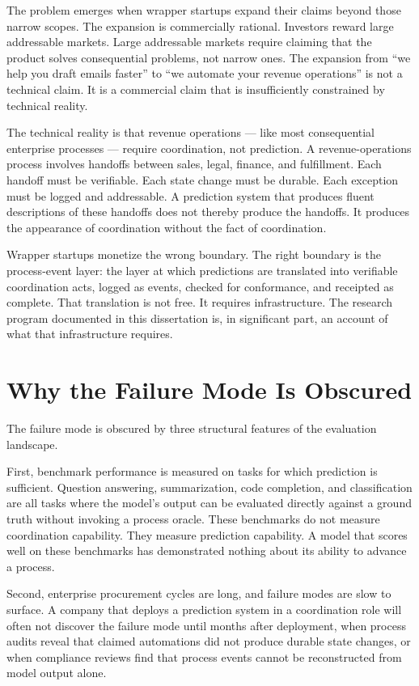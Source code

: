 The problem emerges when wrapper startups expand their claims beyond those narrow scopes. The expansion is commercially rational. Investors reward large addressable markets. Large addressable markets require claiming that the product solves consequential problems, not narrow ones. The expansion from ``we help you draft emails faster'' to ``we automate your revenue operations'' is not a technical claim. It is a commercial claim that is insufficiently constrained by technical reality.

The technical reality is that revenue operations --- like most consequential enterprise processes --- require coordination, not prediction. A revenue-operations process involves handoffs between sales, legal, finance, and fulfillment. Each handoff must be verifiable. Each state change must be durable. Each exception must be logged and addressable. A prediction system that produces fluent descriptions of these handoffs does not thereby produce the handoffs. It produces the appearance of coordination without the fact of coordination.

Wrapper startups monetize the wrong boundary. The right boundary is the process-event layer: the layer at which predictions are translated into verifiable coordination acts, logged as events, checked for conformance, and receipted as complete. That translation is not free. It requires infrastructure. The research program documented in this dissertation is, in significant part, an account of what that infrastructure requires.

\section{Why the Failure Mode Is Obscured}

The failure mode is obscured by three structural features of the evaluation landscape.

First, benchmark performance is measured on tasks for which prediction is sufficient. Question answering, summarization, code completion, and classification are all tasks where the model's output can be evaluated directly against a ground truth without invoking a process oracle. These benchmarks do not measure coordination capability. They measure prediction capability. A model that scores well on these benchmarks has demonstrated nothing about its ability to advance a process.

Second, enterprise procurement cycles are long, and failure modes are slow to surface. A company that deploys a prediction system in a coordination role will often not discover the failure mode until months after deployment, when process audits reveal that claimed automations did not produce durable state changes, or when compliance reviews find that process events cannot be reconstructed from model output alone.

